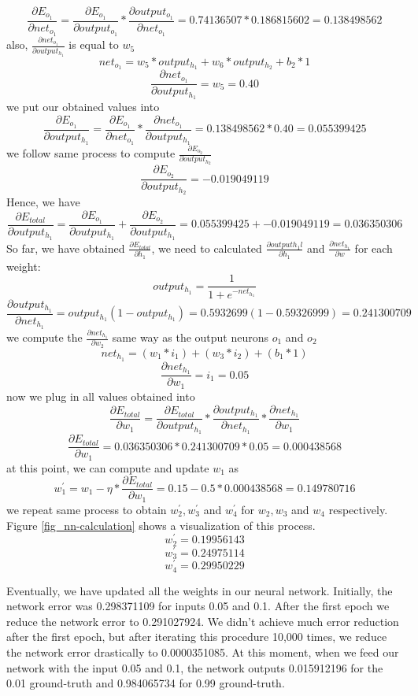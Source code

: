 \documentclass[master]{thesis-uestc}
\begin{document}
\[ \frac{\partial E_{o_1}}{\partial net_{o_1}} = \frac{\partial E_{o_1}}{\partial output_{o_1}} * \frac{\partial output_{o_1}}{\partial net_{o_1}} = 0.74136507 * 0.186815602 = 0.138498562\]
also, $\frac{\partial net_{o_1}}{\partial output_{h_1}}$ is equal to $w_5$
\[ net_{o_1} = w_5 * output_{h_1} + w_6 * output_{h_2} + b_2 * 1 \]
\[ \frac{\partial net_{o_1}}{\partial output_{h_1}} = w_5 = 0.40 \]
we put our obtained values into
\[ \frac{\partial E_{o_1}}{\partial output_{h_1}} = \frac{\partial E_{o_1}}{\partial net_{o_1}} * \frac{\partial net_{o_1}}{\partial output_{h_1}} = 0.138498562 * 0.40 = 0.055399425 \]
we follow same process to compute $\frac{\partial E_{o_2}}{\partial output_{h_2}}$
\[ \frac{\partial E_{o_2}}{\partial output_{h_2}} = -0.019049119 \]
Hence, we have
\[ \frac{\partial E_{total}}{\partial output_{h_1}} = \frac{\partial E_{o_1}}{\partial output_{h_1}} + \frac{\partial E_{o_2}}{\partial output_{h_1}} = 0.055399425 + -0.019049119 = 0.036350306\]
So far, we have obtained $\frac{\partial E_{total}}{\partial h_1}$, we need to calculated $\frac{\partial output{h_1l}}{\partial h_1}$ and $\frac{\partial net_{h_1}}{\partial w}$ for each weight:
\[ output_{h_1} = \frac{1}{1 + e^{-net_{h_1}}} \]
\[ \frac{\partial output_{h_1}}{\partial net_{h_1}} = output_{h_1}(1 - output_{h_1}) = 0.5932699(1 - 0.59326999) = 0.241300709  \]
we compute the $\frac{\partial net_{h_1}}{\partial w_2}$ same way as the output neurons $o_1$ and $o_2$
\[ net_{h_1} = (w_1 * i_1) + (w_3 * i_2) + (b_1 * 1) \]
\[ \frac{\partial net_{h_1}}{\partial w_1} = i_1 = 0.05 \]
now we plug in all values obtained into
\[ \frac{\partial E_{total}}{\partial w_1} = \frac{\partial E_{total}}{\partial output_{h_1}} * \frac{\partial output_{h_1}}{\partial net_{h_1}} * \frac{\partial net_{h_1}}{\partial w_1} \]
\[ \frac{\partial E_{total}}{\partial w_1} = 0.036350306 * 0.241300709 * 0.05 = 0.000438568 \]
at this point, we can compute and update $w_1$ as
\[ w_{1}^{\prime} = w_1 - \eta * \frac{\partial E_{total}}{\partial w_1} = 0.15 - 0.5 * 0.000438568 = 0.149780716 \]
we repeat same process to obtain $w_{2}^{\prime}, w_{3}^{\prime}$ and $w_{4}^{\prime}$ for $w_2, w_3$ and $w_4$ respectively. Figure \ref{fig_nn-calculation} shows a visualization of this process.
\[ w_{2}^{\prime} = 0.19956143 \]
\[ w_{3}^{\prime} = 0.24975114 \]
\[ w_{4}^{\prime} = 0.29950229 \]

Eventually, we have updated all the weights in our neural network. Initially, the network error was 0.298371109 for inputs 0.05 and 0.1. After the first epoch we reduce the network error to 0.291027924. We didn't achieve much error reduction after the first epoch, but after iterating this procedure 10,000 times, we reduce the network error drastically to 0.0000351085. At this moment, when we feed our network with the input 0.05 and 0.1, the network outputs 0.015912196 for the 0.01 ground-truth and 0.984065734 for 0.99 ground-truth.
\end{document}
